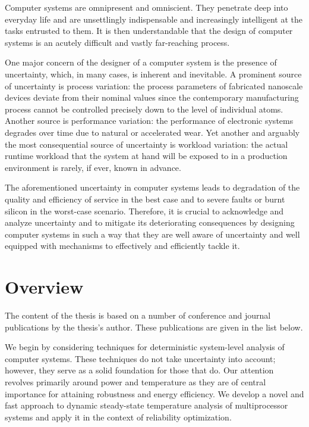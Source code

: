Computer systems are omnipresent and omniscient. They penetrate deep into
everyday life and are unsettlingly indispensable and increasingly intelligent at
the tasks entrusted to them. It is then understandable that the design of
computer systems is an acutely difficult and vastly far-reaching process.

One major concern of the designer of a computer system is the presence of
uncertainty, which, in many cases, is inherent and inevitable. A prominent
source of uncertainty is process variation: the process parameters of fabricated
nanoscale devices deviate from their nominal values since the contemporary
manufacturing process cannot be controlled precisely down to the level of
individual atoms. Another source is performance variation: the performance of
electronic systems degrades over time due to natural or accelerated wear. Yet
another and arguably the most consequential source of uncertainty is workload
variation: the actual runtime workload that the system at hand will be exposed
to in a production environment is rarely, if ever, known in advance.

The aforementioned uncertainty in computer systems leads to degradation of the
quality and efficiency of service in the best case and to severe faults or burnt
silicon in the worst-case scenario. Therefore, it is crucial to acknowledge and
analyze uncertainty and to mitigate its deteriorating consequences by designing
computer systems in such a way that they are well aware of uncertainty and well
equipped with mechanisms to effectively and efficiently tackle it.

\section{Overview}

The content of the thesis is based on a number of conference and journal
publications by the thesis's author. These publications are given in the list
below.

\printbibliography[heading=none,keyword=own]

We begin by considering techniques for deterministic system-level analysis of
computer systems. These techniques do not take uncertainty into account;
however, they serve as a solid foundation for those that do. Our attention
revolves primarily around power and temperature as they are of central
importance for attaining robustness and energy efficiency. We develop a novel
and fast approach to dynamic steady-state temperature analysis of multiprocessor
systems and apply it in the context of reliability optimization.

